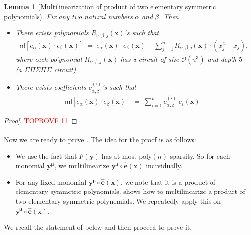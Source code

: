 \documentclass[11pt]{article}
\newtheorem{lemma}[theorem]{Lemma}
\newcommand{\bigO}{\mathcal{O}}
\newcommand{\ml}{\mathsf{ml}}
\begin{document}
\begin{lemma}[Multilinearization of product of two elementary symmetric polynomials]\label{lemma:ml-prod-two-elem}
Fix any two natural numbers $\alpha$ and $\beta$. Then
\begin{itemize}
    \item There exists polynomials $R_{\alpha, \beta,j}(\mathbf{x})$'s such that
    \begin{align*}
        \ml[e_{\alpha}(\mathbf{x}) \cdot e_{\beta}(\mathbf{x})] \; = \; e_{\alpha}(\mathbf{x}) \cdot e_{\beta}(\mathbf{x}) - \sum_{j=1}^{n} R_{\alpha, \beta, j}(\mathbf{x}) \cdot (x_{j}^{2} - x_{j}),
    \end{align*}
    where each polynomial $R_{\alpha, \beta, j}(\mathbf{x})$ has a circuit of size $\bigO(n^{3})$ and depth $5$ (a $\Sigma \Pi \Sigma \Pi \Sigma$ circuit).
    \item There exists coefficients $c_{\alpha, \beta}^{(i)}$'s such that
    \begin{align*}
        \ml[e_{\alpha}(\mathbf{x}) \cdot e_{\beta}(\mathbf{x})] \; = \; \sum_{i = 1}^{n} c_{\alpha,\beta}^{(i)} \; e_{i}(\mathbf{x})
    \end{align*}
\end{itemize}
\end{lemma}


\begin{proof}\textcolor{red}{TOPROVE 11}\end{proof}




\paragraph{}Now we are ready to prove . The idea for the proof is as follows:
\begin{itemize}
    \item We use the fact that $F(\mathbf{y})$ has at most $\mathrm{poly}(n)$ sparsity. So for each monomial $\mathbf{y}^{\bm{\mu}}$, we multilinearize $\mathbf{y}^{\bm{\mu}} \circ \widehat{\mathbf{e}}(\mathbf{x})$ individually. 
    \item For any fixed monomial $\mathbf{y}^{\bm{\mu}} \circ \widehat{\mathbf{e}}(\mathbf{x})$, we note that it is a product of elementary symmetric polynomials.  shows how to multilinearize a product of two elementary symmetric polynomials. We repeatedly apply this on $\mathbf{y}^{\bm{\mu}} \circ \widehat{\mathbf{e}}(\mathbf{x})$.
\end{itemize}
We recall the statement of  below and then proceed to prove it.
\end{document}
